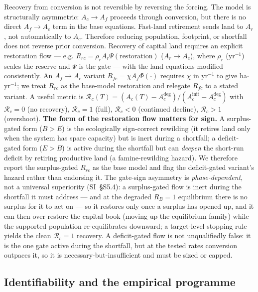 \documentclass[11pt]{article}
\begin{document}
Recovery from conversion is not reversible by reversing the forcing. The model is structurally asymmetric: $A_c\to A_f$ proceeds through conversion, but there is no direct $A_f\to A_c$ term in the base equations. Fast-land retirement sends land to $A_r$, not automatically to $A_c$. Therefore reducing population, footprint, or shortfall does not reverse prior conversion. Recovery of capital land requires an explicit restoration flow --- e.g. $R_{rc}=\rho_rA_r\Psi(\text{restoration})$ ($A_r\to A_c$), where $\rho_r$ (yr$^{-1}$) scales the reserve and $\Psi$ is the gate --- with the land equations modified consistently. An $A_f\to A_c$ variant $R_{fc}=\chi A_f\Phi(\cdot)$ requires $\chi$ in yr$^{-1}$ to give ha$\cdot$yr$^{-1}$; we treat $R_{rc}$ as the base-model restoration and relegate $R_{fc}$ to a stated variant. A useful metric is $\mathcal{R}_c(T)=(A_c(T)-A_c^{\mathrm{deg}})/(A_c^{\mathrm{init}}-A_c^{\mathrm{deg}})$ with $\mathcal{R}_c=0$ (no recovery), $\mathcal{R}_c=1$ (full), $\mathcal{R}_c<0$ (continued decline), $\mathcal{R}_c>1$ (overshoot). \textbf{The form of the restoration flow matters for sign.} A surplus-gated form ($B>E$) is the ecologically sign-correct rewilding (it retires land only when the system has spare capacity) but is inert during a shortfall; a deficit-gated form ($E>B$) is active during the shortfall but can \emph{deepen} the short-run deficit by retiring productive land (a famine-rewilding hazard). We therefore report the surplus-gated $R_{rc}$ as the base model and flag the deficit-gated variant's hazard rather than endorsing it. The gate-sign asymmetry is \emph{phase-dependent}, not a universal superiority (SI~\S S5.4): a surplus-gated flow is inert during the shortfall it must address --- and at the degraded $R_B=1$ equilibrium there is no surplus for it to act on --- so it restores only once a surplus has opened up, and it can then over-restore the capital book (moving up the equilibrium family) while the supported population re-equilibrates downward; a target-level stopping rule yields the clean $\mathcal{R}_c=1$ recovery. A deficit-gated flow is not unqualifiedly false: it is the one gate active during the shortfall, but at the tested rates conversion outpaces it, so it is necessary-but-insufficient and must be sized or capped.

\subsection{Identifiability and the empirical programme}
\end{document}
